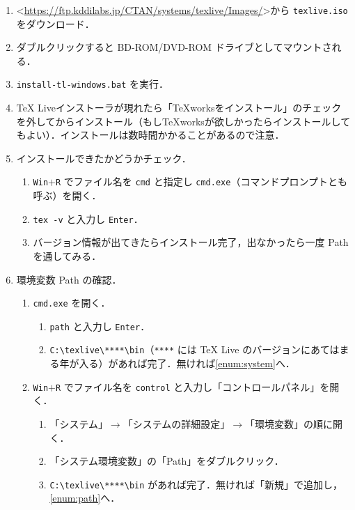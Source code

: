 \begin{enumerate}
    \item \textless\url{https://ftp.kddilabs.jp/CTAN/systems/texlive/Images/}\textgreater から \verb|texlive.iso| をダウンロード．
    \item ダブルクリックすると BD-ROM/DVD-ROM ドライブとしてマウントされる．
    \item \verb|install-tl-windows.bat| を実行．
    \item TeX Liveインストーラが現れたら「TeXworksをインストール」のチェックを外してからインストール（もしTeXworksが欲しかったらインストールしてもよい）．インストールは数時間かかることがあるので注意．
    \item インストールできたかどうかチェック．
    \begin{enumerate}
        \item \verb|Win|$+$\verb|R| でファイル名を \verb|cmd| と指定し \verb|cmd.exe|（コマンドプロンプトとも呼ぶ）を開く．
        \item \verb|tex -v| と入力し \verb|Enter|．
        \item バージョン情報が出てきたらインストール完了，出なかったら一度 Path を通してみる．
    \end{enumerate}
    \item 環境変数 Path の確認．
    \begin{enumerate}
        \item \verb|cmd.exe| を開く．\label{enum:path}
        \begin{enumerate}
            \item \verb|path| と入力し \verb|Enter|．
            \item \verb|C:\texlive\****\bin|（\verb|****| には TeX Live のバージョンにあてはまる年が入る）があれば完了．無ければ\ref{enum:system}へ．
        \end{enumerate}
        \item \verb|Win|$+$\verb|R| でファイル名を \verb|control| と入力し「コントロールパネル」を開く．\label{enum:system}
        \begin{enumerate}
            \item 「システム」$\to$「システムの詳細設定」$\to$「環境変数」の順に開く．
            \item 「システム環境変数」の「Path」をダブルクリック．
            \item \verb|C:\texlive\****\bin| があれば完了．無ければ「新規」で追加し，\ref{enum:path}へ．
        \end{enumerate}
    \end{enumerate}
\end{enumerate}



